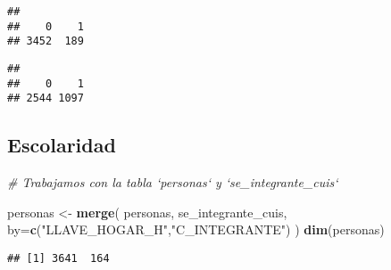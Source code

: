 \documentclass[11pt,]{article}
\newenvironment{Shaded}{\begin{snugshade}}{\end{snugshade}}
\newcommand{\KeywordTok}[1]{\textcolor[rgb]{0.13,0.29,0.53}{\textbf{#1}}}
\newcommand{\DataTypeTok}[1]{\textcolor[rgb]{0.13,0.29,0.53}{#1}}
\newcommand{\DecValTok}[1]{\textcolor[rgb]{0.00,0.00,0.81}{#1}}
\newcommand{\StringTok}[1]{\textcolor[rgb]{0.31,0.60,0.02}{#1}}
\newcommand{\CommentTok}[1]{\textcolor[rgb]{0.56,0.35,0.01}{\textit{#1}}}
\newcommand{\OperatorTok}[1]{\textcolor[rgb]{0.81,0.36,0.00}{\textbf{#1}}}
\newcommand{\NormalTok}[1]{#1}
\begin{document}
\begin{verbatim}
## 
##    0    1 
## 3452  189
\end{verbatim}

\begin{Shaded}
\end{Shaded}

\begin{verbatim}
## 
##    0    1 
## 2544 1097
\end{verbatim}

\subsection{Escolaridad}\label{escolaridad}

\begin{Shaded}
\begin{Highlighting}[]
\CommentTok{# Trabajamos con la tabla `personas` y `se_integrante_cuis`}

\NormalTok{personas <-}\StringTok{ }\KeywordTok{merge}\NormalTok{( personas, }
\NormalTok{                   se_integrante_cuis,}
                   \DataTypeTok{by=}\KeywordTok{c}\NormalTok{(}\StringTok{"LLAVE_HOGAR_H"}\NormalTok{,}\StringTok{"C_INTEGRANTE"}\NormalTok{) )}
\KeywordTok{dim}\NormalTok{(personas)}
\end{Highlighting}
\end{Shaded}

\begin{verbatim}
## [1] 3641  164
\end{verbatim}
\end{document}
